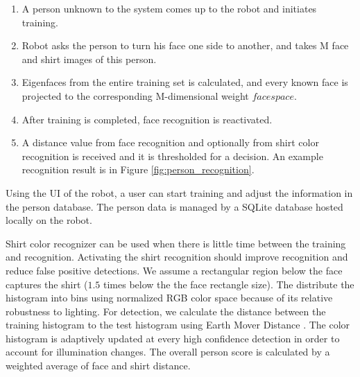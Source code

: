 \begin{enumerate}
\item A person unknown to the system comes up to the robot and initiates training.
\item Robot asks the person to turn his face one side to another, and takes M face and shirt images of this person.
\item Eigenfaces from the entire training set is calculated, and every known face is projected to the corresponding M-dimensional weight $facespace$.
\item After training is completed, face recognition is reactivated.
\item A distance value from face recognition and optionally from shirt color recognition is received and it is thresholded for a decision. An example recognition result is in Figure \ref{fig:person_recognition}. 
\end{enumerate}

Using the UI of the robot, a user can start training and adjust the information in the person database. The person data is managed by a SQLite database hosted locally on the robot.

Shirt color recognizer can be used when there is little time between the training and recognition. Activating the shirt recognition should improve recognition and reduce false positive detections. We assume a rectangular region below the face captures the shirt ($1.5$ times below the the face rectangle size). The distribute the histogram into bins using normalized RGB color space because of its relative robustness to lighting. For detection, we calculate the distance between the training histogram to the test histogram using Earth Mover Distance \cite{rubner1998metric}. The color histogram is adaptively updated at every high confidence detection in order to account for illumination changes. The overall person score is calculated by a weighted average of face and shirt distance.

